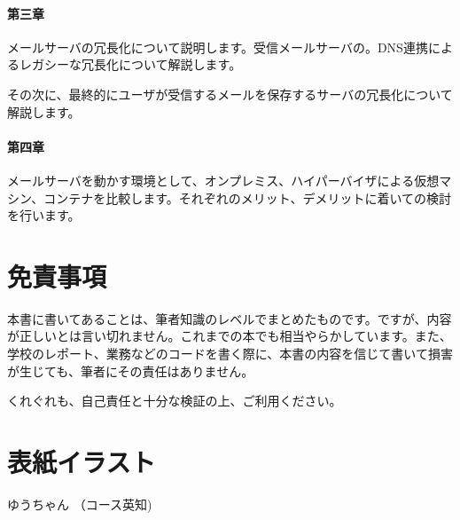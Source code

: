 \paragraph{第三章}
メールサーバの冗長化について説明します。受信メールサーバの。DNS連携によるレガシーな冗長化について解説します。

その次に、最終的にユーザが受信するメールを保存するサーバの冗長化について解説します。

\paragraph{第四章}
メールサーバを動かす環境として、オンプレミス、ハイパーバイザによる仮想マシン、コンテナを比較します。それぞれのメリット、デメリットに着いての検討を行います。

\section*{免責事項}
本書に書いてあることは、筆者知識のレベルでまとめたものです。ですが、内容が正しいとは言い切れません。これまでの本でも相当やらかしています。また、学校のレポート、業務などのコードを書く際に、本書の内容を信じて書いて損害が生じても、筆者にその責任はありません。

くれぐれも、自己責任と十分な検証の上、ご利用ください。

\section*{表紙イラスト}
ゆうちゃん （コース英知)